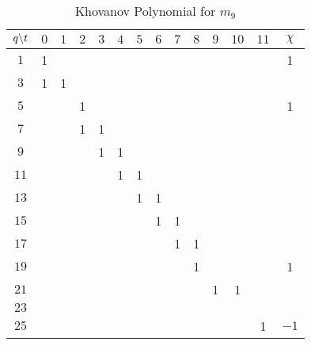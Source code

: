 \documentclass{article}
\theoremstyle{plain}
\begin{document}
        \begin{table}[H]
            \centering
            \begin{tabular}{| c | c | c | c | c | c | c | c | c | c | c | c | c | c |}
                \hline
                $q\symbol{92}t$&$0$&$1$&$2$&$3$&$4$&$5$&$6$&$7$&$8$&$9$&$10$&$11$&$\chi$\\
                \hline
                $1$&1&&&&&&&&&&&&1\\
                \hline
                $3$&1&1&&&&&&&&&&&\\
                \hline
                $5$&&&1&&&&&&&&&&1\\
                \hline
                $7$&&&1&1&&&&&&&&&\\
                \hline
                $9$&&&&1&1&&&&&&&&\\
                \hline
                $11$&&&&&1&1&&&&&&&\\
                \hline
                $13$&&&&&&1&1&&&&&&\\
                \hline
                $15$&&&&&&&1&1&&&&&\\
                \hline
                $17$&&&&&&&&1&1&&&&\\
                \hline
                $19$&&&&&&&&&1&&&&1\\
                \hline
                $21$&&&&&&&&&&1&1&&\\
                \hline
                $23$&&&&&&&&&&&&&\\
                \hline
                $25$&&&&&&&&&&&&1&$-1$\\
                \hline
            \end{tabular}
            \caption{Khovanov Polynomial for $m_{9}$}
            \label{table:m_9_kho}
        \end{table}
\end{document}
